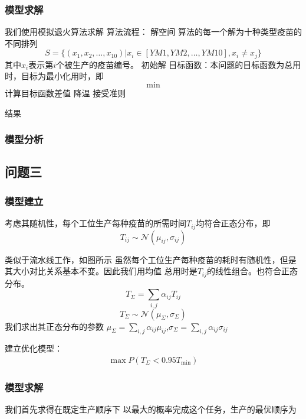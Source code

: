 \documentclass[UTF8]{ctexart}
\begin{document}
	\subsubsection{模型求解}
	我们使用模拟退火算法求解
	算法流程：
	解空间
	算法的每一个解为十种类型疫苗的不同排列
	\begin{equation}
		S=\{(x_1,x_2,\dots,x_{10})|x_{i}\in[YM1,YM2,\dots,YM10],x_{i}\neq x_{j}\}
	\end{equation}
	其中$x_{i}$表示第$i$个被生产的疫苗编号。
	初始解
	目标函数：本问题的目标函数为总用时，目标为最小化用时，即
	\begin{equation}
		\min
	\end{equation}
	计算目标函数差值
	降温
	接受准则
	\par 结果
	\subsubsection{模型分析}
	
	\subsection{问题三}
	\subsubsection{模型建立}
	考虑其随机性，每个工位生产每种疫苗的所需时间$T_{ij}$均符合正态分布，即
	\begin{equation}
		T_{ij}\sim\mathcal{N}(\mu_{ij},\sigma_{ij})
	\end{equation}
	
	类似于流水线工作，如图所示
	虽然每个工位生产每种疫苗的耗时有随机性，但是其大小对比关系基本不变。因此我们用均值
	总用时是$T_{ij}$的线性组合。也符合正态分布。
	\begin{equation}
		T_{\Sigma}=\sum_{i,j}\alpha_{ij}T_{ij}
	\end{equation}
	\begin{equation}
		T_{\Sigma}\sim\mathcal{N}(\mu_{\Sigma},\sigma_{\Sigma})
	\end{equation}
	我们求出其正态分布的参数
	$\mu_{\Sigma}=\sum_{i,j}\alpha_{ij}\mu_{ij}$,$\sigma_{\Sigma}=\sum_{i,j}\alpha_{ij}\sigma_{ij}$
	\par 建立优化模型：
	\begin{equation}
	\begin{split}
		\max P(T_{\Sigma}<0.95T_{\min})
	\end{split}
	\end{equation}
	\subsubsection{模型求解}
	我们首先求得在既定生产顺序下
	以最大的概率完成这个任务，生产的最优顺序为
\end{document}
